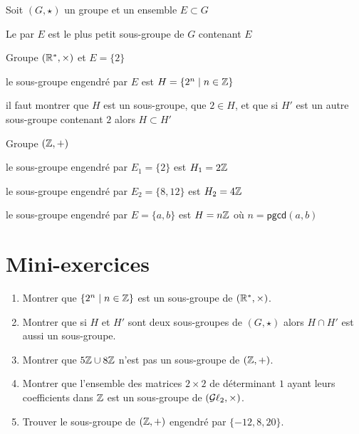\begin{frame}
Soit $(G,\star)$ un groupe et un ensemble $E \subset G$ 


Le  par $E$ est le plus petit sous-groupe de
$G$ contenant $E$


\pause

\begin{exemple}
Groupe $(\mathbb{R}^*,\times)$ et  $E = \{2\}$ 

le sous-groupe engendré par $E$ est $H = \{ 2^n \mid n \in \mathbb{Z}\}$

\pause

il faut montrer que $H$ est un sous-groupe, que $2 \in H$, et que si $H'$ est un autre sous-groupe 
contenant $2$ alors $H \subset H'$
\end{exemple}

\pause

\begin{exemple}
Groupe  $(\mathbb{Z},+)$

le sous-groupe engendré par $E_1= \{2\}$ est $H_1 = 2\mathbb{Z}$

\pause

le sous-groupe engendré par $E_2 = \{8,12\}$ est $H_2 = 4\mathbb{Z}$

\pause

le sous-groupe engendré par $E = \{a,b\}$ est $H = n\mathbb{Z}$ où $n=\mathsf{pgcd}(a,b)$
\end{exemple}
 
\end{frame}







\section*{Mini-exercices}


\begin{frame}

\begin{miniexercice}

\begin{enumerate}
  \item Montrer que $\{ 2^{n} \mid n \in \mathbb{Z} \}$ est un sous-groupe de $(\mathbb{R}^*,\times)$.
  \item Montrer que si $H$ et $H'$ sont deux sous-groupes de $(G,\star)$ 
alors $H\cap H'$ est aussi un sous-groupe. 
  \item Montrer que $5\mathbb{Z} \cup 8\mathbb{Z}$ n'est pas un sous-groupe de $(\mathbb{Z},+)$.
  \item Montrer que l'ensemble des matrices $2\times 2$ de déterminant $1$ ayant leurs coefficients dans $\mathbb{Z}$ 
est un sous-groupe de $(\mathcal{G}\ell_2,\times)$.
  \item Trouver le sous-groupe de $(\mathbb{Z},+)$ engendré par $\{ -12, 8, 20 \}$.
\end{enumerate}

\end{miniexercice}
\end{frame}



